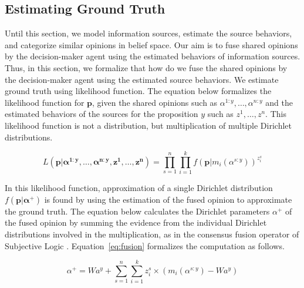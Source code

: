 \documentclass[a4,12pt]{ozu-thesis}
\begin{document}
\subsection{Estimating Ground Truth}
Until this section, we model information sources, estimate the source behaviors, and categorize similar opinions in belief space. Our aim is to fuse shared opinions by the decision-maker agent using the estimated behaviors of information sources. Thus, in this section, we formalize that how do we fuse the shared opinions by the decision-maker agent using the estimated source behaviors. We estimate ground truth using likelihood function. The equation below formalizes the likelihood function for $\mathbf{p}$, given the shared opinions such as $\alpha^{1:y},\ldots,\alpha^{n:y}$ and the estimated behaviors of the sources for the proposition $\mathit{y}$ such as $ z^{1},\ldots,z^{n}$. This likelihood function is not a distribution, but multiplication of multiple Dirichlet distributions.

\begin{equation}
\label{eq:groundtruth}
L\left ( \mathbf{p|\alpha^{1:y},\ldots,\alpha^{n:y},z^{1},\ldots,z^{n}} \right ) = \prod_{s=1}^{n}\prod_{i=1}^{k}f\left ( \mathbf{p}|m_{i}\left (\alpha^{s:y} \right ) \right )^{z_{i}^{s}}
\end{equation}


In this likelihood function, approximation of a single Dirichlet distribution $f\left ( \mathbf{p| \alpha^{+}} \right )$ is found by using the estimation of the fused opinion to approximate the ground truth. The equation below calculates the Dirichlet parameters $\alpha^{+}$ of the fused opinion by summing the evidence from the individual Dirichlet distributions involved in the multiplication, as in the consensus fusion operator of Subjective Logic \cite{josang2002consensus}. Equation~\ref{eq:fusion} formalizes the computation as follows. 


\begin{equation}
\label{eq:fusion}
\alpha^{+} = Wa^{y} + \sum_{s=1}^{n}\sum_{i=1}^{k} z_{i}^{s}\times \left ( m_{i}\left ( \alpha^{s:y} \right ) - Wa^{y} \right )
\end{equation}
\end{document}
